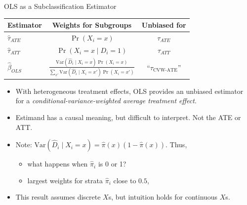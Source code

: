 \documentclass[xcolor=dvipsnames]{beamer}
\newcommand{\Var}{\mathrm{Var}}
\begin{document}
\begin{frame}{OLS as a Subclassification Estimator}
\small
\begin{center}
{\renewcommand{\arraystretch}{1.25}
\begin{tabular}{lcc} \hline
Estimator & Weights for Subgroups & Unbiased for \\ \hline
$\hat\tau_{ATE}$ & $\Pr(X_i=x)$ & $\tau_{ATE}$ \\
$\hat\tau_{ATT}$ & $\Pr(X_i=x\mid D_i=1)$ & $\tau_{ATT}$ \\
$\hat\beta_{OLS}$ & {\scriptsize $\displaystyle\frac{\Var(\hat{D}_i\mid X_i=x)\Pr(X_i=x)}{\sum_{x'}\Var(\hat{D}_i\mid X_i=x')\Pr(X_i=x')}$} & ``$\tau_\text{CVW-ATE}$'' \\ \hline
\end{tabular}
}
\end{center}
\footnotesize
\begin{itemize}
\item<1-> With heterogeneous treatment effects, OLS provides an unbiased estimator for a {\it conditional-variance-weighted average treatment effect}.
\smallskip
\item<2-> Estimand has a causal meaning, but difficult to interpret. Not the ATE or ATT.
\smallskip
\item<3-> Note: $\Var(\hat{D}_i\mid X_i=x) = \hat{\pi}(x)(1-\hat{\pi}(x))$. Thus,
\begin{itemize}
\item<3-> what happens when $\hat{\pi}_i$ is 0 or 1?
\item<4-> largest weights for strata $\hat{\pi}_i$ close to $0.5$,
\end{itemize}
\item<5-> This result assumes discrete $X$s, but intuition holds for continuous $X$s.
\end{itemize}
\end{frame}
\end{document}
